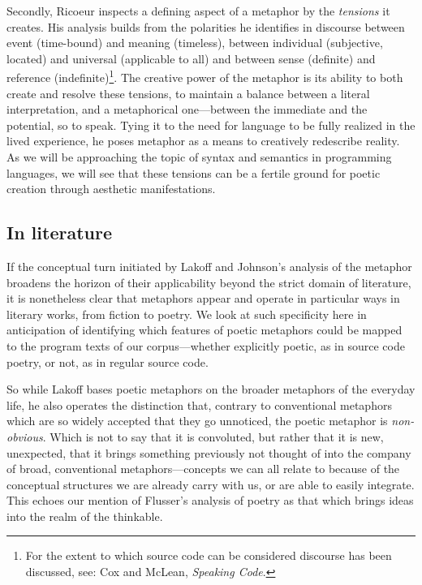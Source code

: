 \documentclass{article}
\begin{document}
Secondly, Ricoeur inspects a defining aspect of a metaphor by the \emph{tensions} it creates. His analysis builds from the polarities he identifies in discourse between event (time-bound) and meaning (timeless), between individual (subjective, located) and universal (applicable to all) and between sense (definite) and reference (indefinite)\footnote{For the extent to which source code can be considered discourse has been discussed, see: Cox and McLean, \emph{Speaking Code}.}. The creative power of the metaphor is its ability to both create and resolve these tensions, to maintain a balance between a literal interpretation, and a metaphorical one—between the immediate and the potential, so to speak. Tying it to the need for language to be fully realized in the lived experience, he poses metaphor as a means to creatively redescribe reality. As we will be approaching the topic of syntax and semantics in programming languages, we will see that these tensions can be a fertile ground for poetic creation through aesthetic manifestations.

\subsection{In literature}

If the conceptual turn initiated by Lakoff and Johnson's analysis of the metaphor broadens the horizon of their applicability beyond the strict domain of literature, it is nonetheless clear that metaphors appear and operate in particular ways in literary works, from fiction to poetry. We look at such specificity here in anticipation of identifying which features of poetic metaphors could be mapped to the program texts of our corpus—whether explicitly poetic, as in source code poetry, or not, as in regular source code.

So while Lakoff bases poetic metaphors on the broader metaphors of the everyday life, he also operates the distinction that, contrary to conventional metaphors which are so widely accepted that they go unnoticed, the poetic metaphor is \emph{non-obvious}. Which is not to say that it is convoluted, but rather that it is new, unexpected, that it brings something previously not thought of into the company of broad, conventional metaphors—concepts we can all relate to because of the conceptual structures we are already carry with us, or are able to easily integrate. This echoes our mention of Flusser's analysis of poetry as that which brings ideas into the realm of the thinkable.
\end{document}
